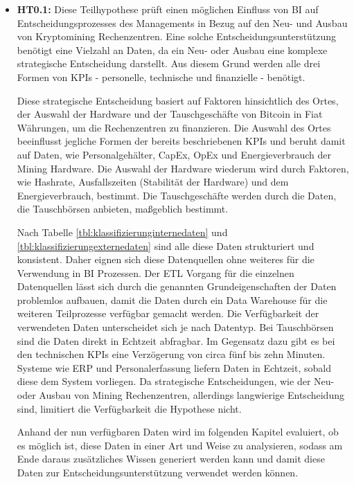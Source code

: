 \begin{itemize}
    \item \textbf{\ac{HT0.1}: }Diese Teilhypothese prüft einen möglichen Einfluss von \ac{BI} auf Entscheidungsprozesses des
    Managements in Bezug auf den Neu- und Ausbau von Kryptomining Rechenzentren. Eine solche Entscheidungsunterstützung benötigt
    eine Vielzahl an Daten, da ein Neu- oder Ausbau eine komplexe strategische Entscheidung darstellt. Aus diesem Grund werden alle
    drei Formen von \acp{KPI} - personelle, technische und finanzielle - benötigt.
    
    Diese strategische Entscheidung basiert auf Faktoren hinsichtlich des Ortes, der Auswahl der Hardware und der
    Tauschgeschäfte von Bitcoin in Fiat Währungen, um die Rechenzentren zu finanzieren. Die Auswahl des Ortes beeinflusst
    jegliche Formen der bereits beschriebenen \acp{KPI} und beruht damit auf Daten, wie Personalgehälter, \ac{CapEx}, \ac{OpEx}
    und Energieverbrauch der Mining Hardware. Die Auswahl der Hardware wiederum wird durch Faktoren, wie Hashrate, Ausfallszeiten
    (Stabilität der Hardware) und dem Energieverbrauch, bestimmt. Die Tauschgeschäfte werden durch die Daten, die Tauschbörsen
    anbieten, maßgeblich bestimmt.
    
    Nach Tabelle \ref{tbl:klassifizierunginternedaten} und \ref{tbl:klassifizierungexternedaten} sind alle diese Daten
    strukturiert und konsistent. Daher eignen sich diese Datenquellen ohne weiteres für die Verwendung in \ac{BI} Prozessen.
    Der \ac{ETL} Vorgang für die einzelnen Datenquellen lässt sich durch die genannten Grundeigenschaften der Daten problemlos
    aufbauen, damit die Daten durch ein Data Warehouse für die weiteren Teilprozesse verfügbar gemacht werden. Die Verfügbarkeit
    der verwendeten Daten unterscheidet sich je nach Datentyp. Bei Tauschbörsen sind die Daten direkt in Echtzeit abfragbar.
    Im Gegensatz dazu gibt es bei den technischen \acp{KPI} eine Verzögerung von circa fünf bis zehn Minuten.  Systeme wie
    \ac{ERP} und Personalerfassung liefern Daten in Echtzeit, sobald diese dem System vorliegen. Da strategische Entscheidungen,
    wie der Neu- oder Ausbau von Mining Rechenzentren, allerdings langwierige Entscheidung sind, limitiert die Verfügbarkeit
    die Hypothese nicht.

    Anhand der nun verfügbaren Daten wird im folgenden Kapitel evaluiert, ob es möglich ist, diese Daten in einer Art und Weise zu
    analysieren, sodass am Ende daraus zusätzliches Wissen generiert werden kann und damit diese Daten zur Entscheidungsunterstützung
    verwendet werden können.


\end{itemize}
